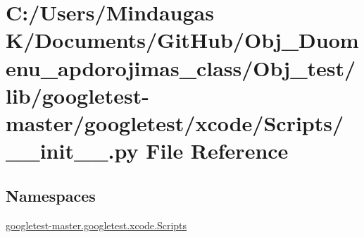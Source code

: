 \hypertarget{_obj__test_2lib_2googletest-master_2googletest_2xcode_2_scripts_2____init_____8py}{}\section{C\+:/\+Users/\+Mindaugas K/\+Documents/\+Git\+Hub/\+Obj\+\_\+\+Duomenu\+\_\+apdorojimas\+\_\+class/\+Obj\+\_\+test/lib/googletest-\/master/googletest/xcode/\+Scripts/\+\_\+\+\_\+init\+\_\+\+\_\+.py File Reference}
\label{_obj__test_2lib_2googletest-master_2googletest_2xcode_2_scripts_2____init_____8py}
\subsection*{Namespaces}
\begin{DoxyCompactItemize}
\item 
 \mbox{\hyperlink{namespacegoogletest-master_1_1googletest_1_1xcode_1_1_scripts}{googletest-\/master.\+googletest.\+xcode.\+Scripts}}
\end{DoxyCompactItemize}
